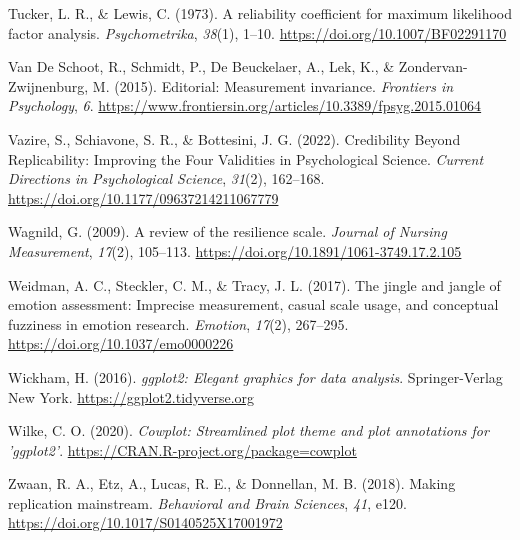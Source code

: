 \documentclass[
  man]{apa7}
\newlength{\cslhangindent}
\newlength{\cslentryspacingunit} %
\newenvironment{CSLReferences}[2] %
 {%
  \setlength{\parindent}{0pt}
  \ifodd #1
  \let\oldpar\par
  \def\par{\hangindent=\cslhangindent\oldpar}
  \fi
  \setlength{\parskip}{#2\cslentryspacingunit}
 }%
 {}
\begin{document}
\begin{CSLReferences}{1}{0}
\leavevmode{}%
Tucker, L. R., \& Lewis, C. (1973). A reliability coefficient for maximum likelihood factor analysis. \emph{Psychometrika}, \emph{38}(1), 1--10. \url{https://doi.org/10.1007/BF02291170}

\leavevmode{}%
Van De Schoot, R., Schmidt, P., De Beuckelaer, A., Lek, K., \& Zondervan-Zwijnenburg, M. (2015). Editorial: Measurement invariance. \emph{Frontiers in Psychology}, \emph{6}. \url{https://www.frontiersin.org/articles/10.3389/fpsyg.2015.01064}

\leavevmode{}%
Vazire, S., Schiavone, S. R., \& Bottesini, J. G. (2022). Credibility Beyond Replicability: Improving the Four Validities in Psychological Science. \emph{Current Directions in Psychological Science}, \emph{31}(2), 162--168. \url{https://doi.org/10.1177/09637214211067779}

\leavevmode{}%
Wagnild, G. (2009). A review of the resilience scale. \emph{Journal of Nursing Measurement}, \emph{17}(2), 105--113. \url{https://doi.org/10.1891/1061-3749.17.2.105}

\leavevmode{}%
Weidman, A. C., Steckler, C. M., \& Tracy, J. L. (2017). The jingle and jangle of emotion assessment: Imprecise measurement, casual scale usage, and conceptual fuzziness in emotion research. \emph{Emotion}, \emph{17}(2), 267--295. \url{https://doi.org/10.1037/emo0000226}

\leavevmode{}%
Wickham, H. (2016). \emph{ggplot2: Elegant graphics for data analysis}. Springer-Verlag New York. \url{https://ggplot2.tidyverse.org}

\leavevmode{}%
Wilke, C. O. (2020). \emph{Cowplot: Streamlined plot theme and plot annotations for 'ggplot2'}. \url{https://CRAN.R-project.org/package=cowplot}

\leavevmode{}%
Zwaan, R. A., Etz, A., Lucas, R. E., \& Donnellan, M. B. (2018). Making replication mainstream. \emph{Behavioral and Brain Sciences}, \emph{41}, e120. \url{https://doi.org/10.1017/S0140525X17001972}

\end{CSLReferences}

\newpage

\hypertarget{appendix-appendix}{%
\appendix}
\end{document}
